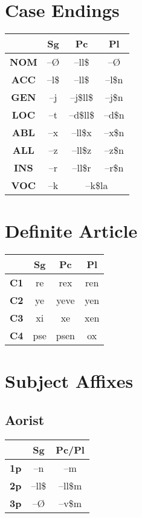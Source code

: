 \documentclass{article}
\begin{document}
\section{Case Endings}

\begin{center}
\begin{tabular}{c| c c c}
  & \textbf{Sg} & \textbf{Pc} & \textbf{Pl} \\
  \hline
\textbf{NOM} & --\O & --ll\$ & --\O\textipa{:} \\
\textbf{ACC} & --l\$ & --ll\$ & --l\$n \\
\textbf{GEN} & --j & --j\$ll\$ & --j\$n \\
\textbf{LOC} & --t & --d\$ll\$  &--d\$n \\
\textbf{ABL} & --x & --ll\$x & --x\$n \\
\textbf{ALL} & --z & --ll\$z & --z\$n \\
\textbf{INS} & --r & --ll\$r & --r\$n \\
\textbf{VOC} & --k & \multicolumn{2}{c}{--k\$la} \\


\end{tabular}

\end{center}


\section{Definite Article}
\begin{center}
\begin{tabular}{c| c c c }
& \textbf{Sg} & \textbf{Pc} & \textbf{Pl} \\
\hline
\textbf{C1} & re & rex & ren \\
\textbf{C2} & ye & yeve & yen \\
\textbf{C3} & xi & xe & xen \\
\textbf{C4} & pse & psen & ox
\end{tabular}
\end{center}


\section{Subject Affixes}

\subsection{Aorist}
\begin{center}

\begin{tabular}{c| c c }
  & \textbf{Sg} & \textbf{Pc/Pl} \\
  \hline
  \textbf{1p} & --n & --m \\
  \textbf{2p}& --ll\$ & --ll\$m \\
  \textbf{3p} & --\O & --v\$m

\end{tabular}

\end{center}
\end{document}
